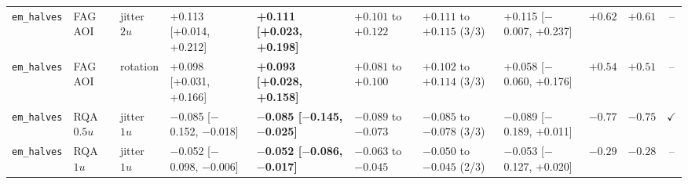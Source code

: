 \begin{longtable}{lllllllllrc}
\texttt{em\_halves} & FAG AOI & jitter $2u$ & +0.113 [+0.014, +0.212] & \textbf{+0.111 [+0.023, +0.198]} & $+0.101$ to $+0.122$ & $+0.111$ to $+0.115$ (3/3) & +0.115 [$-$0.007, +0.237] & $+0.62$ & $+0.61$ & -- \\
\texttt{em\_halves} & FAG AOI & rotation & +0.098 [+0.031, +0.166] & \textbf{+0.093 [+0.028, +0.158]} & $+0.081$ to $+0.100$ & $+0.102$ to $+0.114$ (3/3) & +0.058 [$-$0.060, +0.176] & $+0.54$ & $+0.51$ & -- \\
\texttt{em\_halves} & RQA $0.5u$ & jitter $1u$ & $-$0.085 [$-$0.152, $-$0.018] & \textbf{$-$0.085 [$-$0.145, $-$0.025]} & $-0.089$ to $-0.073$ & $-0.085$ to $-0.078$ (3/3) & $-$0.089 [$-$0.189, +0.011] & $-0.77$ & $-0.75$ & $\checkmark$ \\
\texttt{em\_halves} & RQA $1u$ & jitter $1u$ & $-$0.052 [$-$0.098, $-$0.006] & \textbf{$-$0.052 [$-$0.086, $-$0.017]} & $-0.063$ to $-0.045$ & $-0.050$ to $-0.045$ (2/3) & $-$0.053 [$-$0.127, +0.020] & $-0.29$ & $-0.28$ & -- \\
\end{longtable}
